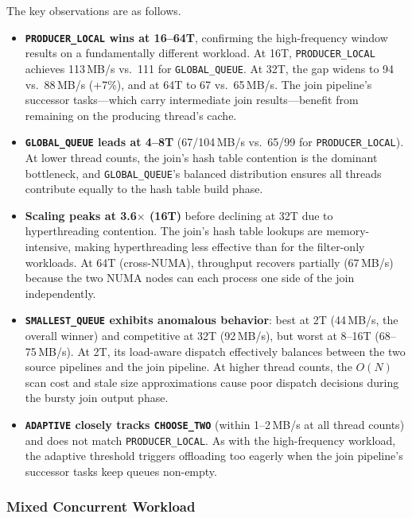 The key observations are as follows.
%
\begin{itemize}
    \item \textbf{\texttt{PRODUCER\_LOCAL} wins at 16--64T}, confirming the high-frequency window results on a fundamentally different workload.
    At 16T, \texttt{PRODUCER\_LOCAL} achieves 113\,MB/s vs.\ 111 for \texttt{GLOBAL\_QUEUE}.
    At 32T, the gap widens to 94 vs.\ 88\,MB/s (+7\%), and at 64T to 67 vs.\ 65\,MB/s.
    The join pipeline's successor tasks---which carry intermediate join results---benefit from remaining on the producing thread's cache.

    \item \textbf{\texttt{GLOBAL\_QUEUE} leads at 4--8T} (67/104\,MB/s vs.\ 65/99 for \texttt{PRODUCER\_LOCAL}).
    At lower thread counts, the join's hash table contention is the dominant bottleneck, and \texttt{GLOBAL\_QUEUE}'s balanced distribution ensures all threads contribute equally to the hash table build phase.

    \item \textbf{Scaling peaks at 3.6$\times$ (16T)} before declining at 32T due to hyperthreading contention.
    The join's hash table lookups are memory-intensive, making hyperthreading less effective than for the filter-only workloads.
    At 64T (cross-NUMA), throughput recovers partially (67\,MB/s) because the two NUMA nodes can each process one side of the join independently.

    \item \textbf{\texttt{SMALLEST\_QUEUE} exhibits anomalous behavior}: best at 2T (44\,MB/s, the overall winner) and competitive at 32T (92\,MB/s), but worst at 8--16T (68--75\,MB/s).
    At 2T, its load-aware dispatch effectively balances between the two source pipelines and the join pipeline.
    At higher thread counts, the $O(N)$ scan cost and stale size approximations cause poor dispatch decisions during the bursty join output phase.

    \item \textbf{\texttt{ADAPTIVE} closely tracks \texttt{CHOOSE\_TWO}} (within 1--2\,MB/s at all thread counts) and does not match \texttt{PRODUCER\_LOCAL}.
    As with the high-frequency workload, the adaptive threshold triggers offloading too eagerly when the join pipeline's successor tasks keep queues non-empty.
\end{itemize}

\subsubsection{Mixed Concurrent Workload}

